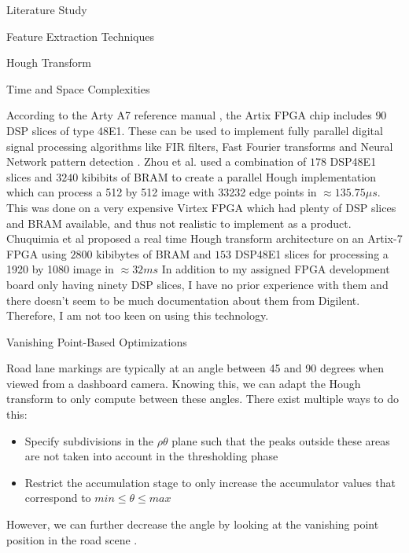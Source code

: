 \documentclass{matthijs}
\begin{document}
\begin{hoofdstuk}{Literature Study}
\begin{paragraaf}{Feature Extraction Techniques}
\begin{subparagraaf}{Hough Transform}
\begin{subsubparagraaf}{Time and Space Complexities}
					\bigskip

					According to the Arty A7 reference manual \cite{digilent2020arty}, the Artix FPGA chip includes $90$ DSP slices of type 48E1.
					These can be used to implement fully parallel digital signal processing algorithms like FIR filters, Fast Fourier transforms and Neural Network pattern detection \cite{xilinx2018series}.
					Zhou et al. \cite{zhou2013efficient} used a combination of $178$ DSP48E1 slices and $3240$ kibibits of BRAM to create a parallel Hough implementation which can process a 512 by 512 image with 33232 edge points in $\approx 135.75 \mu s$.
					This was done on a very expensive Virtex FPGA which had plenty of DSP slices and BRAM available, and thus not realistic to implement as a product.
					Chuquimia et al \cite{chuquimia2018fpga} proposed a real time Hough transform architecture on an Artix-7 FPGA using $2800$ kibibytes of BRAM and $153$ DSP48E1 slices for processing a 1920 by 1080 image in $\approx 32 ms$
					In addition to my assigned FPGA development board only having ninety DSP slices, I have no prior experience with them and there doesn't seem to be much documentation about them from Digilent.
					Therefore, I am not too keen on using this technology.

				\end{subsubparagraaf}

				\begin{subsubparagraaf}{Vanishing Point-Based Optimizations}

					Road lane markings are typically at an angle between 45 and 90 degrees when viewed from a dashboard camera.
					Knowing this, we can adapt the Hough transform to only compute between these angles.
					There exist multiple ways to do this:

					\begin{itemize}

						\item Specify subdivisions in the $\rho\theta$ plane such that the peaks outside these areas are not taken into account in the thresholding phase \cite{solberg2009hough}
						\item Restrict the accumulation stage to only increase the accumulator values that correspond to $ min \leq \theta \leq max $ \cite{looges1993hough}
					\end{itemize}

					However, we can further decrease the angle by looking at the vanishing point position in the road scene \cite{shang2011lane}.


\end{subsubparagraaf}
\end{subparagraaf}
\end{paragraaf}
\end{hoofdstuk}
\end{document}
